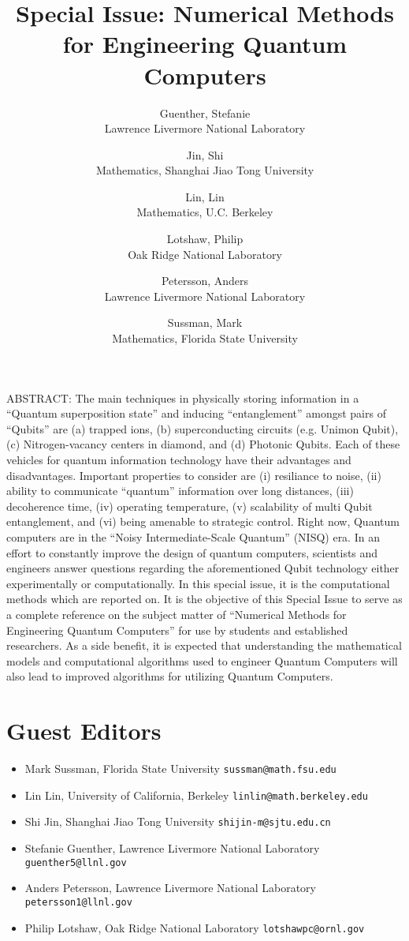 \documentclass[]{article}
\title{Special Issue: Numerical Methods for Engineering Quantum Computers}
\author{
  Guenther, Stefanie \\
  Lawrence Livermore National Laboratory
  \and
  Jin, Shi \\
  Mathematics, Shanghai Jiao Tong University
  \and
  Lin, Lin \\
  Mathematics, U.C. Berkeley
  \and
  Lotshaw, Philip \\
  Oak Ridge National Laboratory
  \and
  Petersson, Anders \\
  Lawrence Livermore National Laboratory
  \and
  Sussman, Mark \\
  Mathematics, Florida State University
}
\begin{document}
\maketitle

ABSTRACT:
The main techniques in physically storing information in a ``Quantum superposition state'' and inducing ``entanglement'' amongst pairs of ``Qubits'' are (a) trapped ions, (b) superconducting circuits (e.g. Unimon Qubit), (c) Nitrogen-vacancy centers in diamond, and (d) Photonic Qubits.  Each of these vehicles for quantum information technology have their advantages and disadvantages.  Important properties to consider are (i) resiliance to noise, (ii) ability to communicate ``quantum'' information over long distances, (iii) decoherence time, (iv) operating temperature, (v) scalability of multi Qubit entanglement, and (vi) being amenable to strategic control.  Right now, Quantum computers are in the ``Noisy Intermediate-Scale Quantum'' (NISQ) era.  In an effort to constantly improve the design of quantum computers, scientists and engineers answer questions regarding the aforementioned Qubit technology either experimentally or computationally.  In this special issue, it is the computational methods which are reported on.  It is the objective of this Special Issue to serve as a complete reference on the subject matter of ``Numerical Methods for Engineering Quantum Computers'' for use by students and established researchers.  As a side benefit, it is expected that understanding the mathematical models and computational algorithms used to engineer Quantum Computers will also lead to improved algorithms for utilizing Quantum Computers.

\section{Guest Editors}

\begin{itemize}
\item
Mark Sussman, Florida State University \verb=sussman@math.fsu.edu=
\item
Lin Lin, University of California, Berkeley \verb=linlin@math.berkeley.edu=
\item
Shi Jin, Shanghai Jiao Tong University \verb=shijin-m@sjtu.edu.cn=
\item
Stefanie Guenther, Lawrence Livermore National Laboratory
\verb=guenther5@llnl.gov=
\item
Anders Petersson, Lawrence Livermore National Laboratory
\verb=petersson1@llnl.gov=
\item
Philip Lotshaw, Oak Ridge National Laboratory
\verb=lotshawpc@ornl.gov=
\end{itemize}
\end{document}

